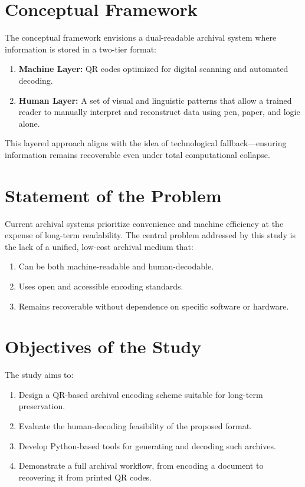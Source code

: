 \documentclass[../main]{subfiles}
\begin{document}
\section{Conceptual Framework}

The conceptual framework envisions a dual-readable archival system where information is stored in a two-tier format:

\begin{enumerate}
\item \textbf{Machine Layer:} QR codes optimized for digital scanning and automated decoding.
\item \textbf{Human Layer:} A set of visual and linguistic patterns that allow a trained reader to manually interpret and reconstruct data using pen, paper, and logic alone.
\end{enumerate}

This layered approach aligns with the idea of technological fallback—ensuring information remains recoverable even under total computational collapse.

\section{Statement of the Problem}

Current archival systems prioritize convenience and machine efficiency at the expense of long-term readability. The central problem addressed by this study is the lack of a unified, low-cost archival medium that:
\begin{enumerate}
\item Can be both machine-readable and human-decodable.
\item Uses open and accessible encoding standards.
\item Remains recoverable without dependence on specific software or hardware.
\end{enumerate}

\section{Objectives of the Study}

The study aims to:
\begin{enumerate}
\item Design a QR-based archival encoding scheme suitable for long-term preservation.
\item Evaluate the human-decoding feasibility of the proposed format.
\item Develop Python-based tools for generating and decoding such archives.
\item Demonstrate a full archival workflow, from encoding a document to recovering it from printed QR codes.
\end{enumerate}
\end{document}
